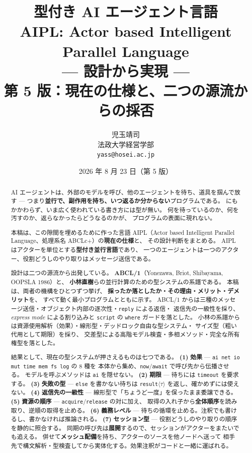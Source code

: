 \documentclass[11pt,a4paper]{ltjsarticle}
\title{\bfseries 型付き AI エージェント言語\\[1.5mm]
       \bfseries AIPL: Actor based Intelligent Parallel Language\\[2mm]
       \large --- 設計から実現 ---\\[1mm]
       \normalsize 第 5 版：現在の仕様と、二つの源流からの採否}
\author{児玉靖司\\\small 法政大学経営学部\\\small \texttt{yass@hosei.ac.jp}}
\date{2026 年 8 月 23 日（第 5 版）}
\theoremstyle{definition}
\theoremstyle{remark}
\begin{document}
\maketitle

\begin{abstract}
AI エージェントは、外部のモデルを呼び、他のエージェントを待ち、道具を掴んで放す ---
つまり\textbf{並行で、副作用を持ち、いつ返るか分からない}プログラムである。
にもかかわらず、いま広く使われている書き方には型が無い。
何を待っているのか、何を汚すのか、返らなかったらどうなるのかが、
プログラムの表面に現れない。

本稿は、この隙間を埋めるために作った言語 AIPL（Actor based Intelligent
Parallel Language、処理系名 ABCLc+）の\textbf{現在の仕様}と、
その設計判断をまとめる。
AIPL はアクターを単位とする\textbf{型付き並行言語}であり、
一つのエージェントは一つのアクター、役割どうしのやり取りはメッセージ送信である。

設計は二つの源流から出発している。
\textbf{ABCL/1}（Yonezawa, Briot, Shibayama, OOPSLA 1986）と、
\textbf{小林直樹}らの並行計算のための型システムの系譜である。
本稿は、両者の機構をひとつずつ挙げ、
\textbf{採ったか落としたか・その理由・メリット・デメリット}を、
すべて動く最小プログラムとともに示す。
ABCL/1 からは三種のメッセージ送信・オブジェクト内部の逐次性・\texttt{reply} による返信・
返信先の一級性を採り、\textit{express mode} による割り込みと
\texttt{script} の \texttt{where} ガードを落とした。
小林の系譜からは資源使用解析（効果）・線形型・デッドロック自由な型システム・
サイズ型（粗い代用として期限）を採り、
交差型による高階モデル検査・多相メソッド・完全な所有権型を落とした。

結果として、現在の型システムが押さえるものは七つである。
\textbf{(1)} \textbf{効果} --- \texttt{ai net io mut time mem fs log} の 8 種を
本体から集め、\texttt{now}/\texttt{await} で呼び先から伝播させる。
モデルを呼ぶメソッドは \texttt{ai} を隠せない。
\textbf{(2)} \textbf{期限} --- 待ちには \texttt{timeout} を要求する。
\textbf{(3)} \textbf{失敗の型} --- \texttt{else} を書かない待ちは
\texttt{result}$\langle\tau\rangle$ を返し、確かめずには使えない。
\textbf{(4)} \textbf{返信先の一級性} --- 線形型で「ちょうど一度」を保ったまま委譲できる。
\textbf{(5)} \textbf{資源の順序} --- \texttt{acquire}/\texttt{release} の対に加え、
取得の入れ子から\textbf{全体順序}を読み取り、逆順の取得を止める。
\textbf{(6)} \textbf{義務レベル} --- 待ちの循環を止める。注釈でも書けるし、書かなければ推論される。
\textbf{(7)} \textbf{セッション型} --- 役割どうしのやり取りの順序を静的に照合する。
同期の呼び先は\textbf{展開}するので、セッションがアクターをまたいでも追える。
併せて\textbf{メッシュ配備}を持ち、アクターのソースを他ノードへ送って
相手先で構文解析・型検査してから実体化する。効果注釈がコードと一緒に運ばれる。


\end{abstract}
\end{document}
